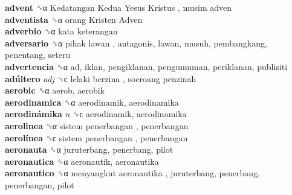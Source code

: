 \textbf{advent} ␝α   Kedatangan Kedua Yesus Kristus ,  musim adven   \\
\textbf{adventista} ␝α   orang Kristen Adven   \\
\textbf{adverbio} ␝α   kata keterangan   \\
\textbf{adversario} ␝α   pihak lawan , antagonis, lawan, musuh, pembangkang, penentang, seteru  \\
\textbf{advertencia} ␝α  ad, iklan, pengiklanan, pengumuman, periklanan, publisiti  \\
\textbf{adúltero} \emph{adj}  ␝ϲ   lelaki berzina ,  soeroang penzinah   \\
\textbf{aerobic} ␝α  aerob, aerobik  \\
\textbf{aerodinamica} ␝α  aerodinamik, aerodinamika  \\
\textbf{aerodinámika} \emph{n}  ␝ϲ  aerodinamik, aerodinamika  \\
\textbf{aerolinea} ␝α   sistem penerbangan , penerbangan  \\
\textbf{aerolínea} ␝ϲ   sistem penerbangan , penerbangan  \\
\textbf{aeronauta} ␝α  juruterbang, penerbang, pilot  \\
\textbf{aeronautica} ␝α  aeronautik, aeronautika  \\
\textbf{aeronautico} ␝α   menyangkut aeronautika , juruterbang, penerbang, penerbangan, pilot  \\
